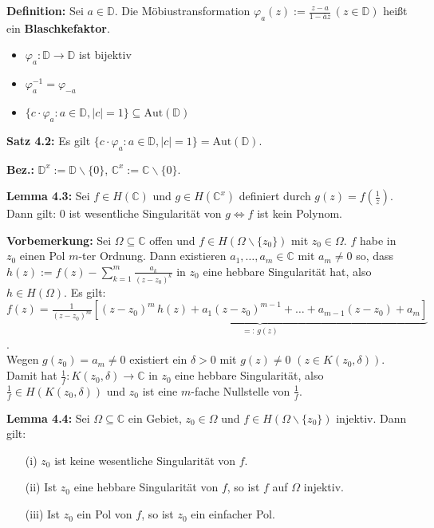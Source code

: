 \documentclass[11pt]{article}
\newcommand{\C}{\mathbb{C}}
\newcommand{\D}{\mathbb{D}}
\begin{document}
\textbf{Definition:} Sei $a \in \D$. Die Möbiustransformation $\varphi_a(z) := \frac{z-a}{1-\overline{a}z} \, (z \in \D)$ heißt ein \textbf{Blaschkefaktor}.
\vspace{-0.6cm}
\begin{itemize}
\item $\varphi_a \colon \D \to \D$ ist bijektiv \vspace{-0.2cm}
\item $\varphi_a^{-1} = \varphi_{-a}$ \vspace{-0.2cm}
\item $\{ c \cdot \varphi_a \colon a \in \D, |c| =1 \} \subseteq \text{Aut}(\D)$
\end{itemize}
\vspace{-0.3cm}

\textbf{Satz 4.2:} Es gilt $\{ c \cdot \varphi_a \colon a \in \D, |c| =1 \} = \text{Aut}(\D)$.

\textbf{Bez.:} $\D^x := \D \backslash \{0\}$, $\C^x := \C \backslash \{0\}$.

\textbf{Lemma 4.3:} Sei $f \in H(\C)$ und $g \in H(\C^x)$ definiert durch $g(z) = f(\frac{1}{z})$. Dann gilt: $0$ ist wesentliche Singularität von $g \Leftrightarrow f$ ist kein Polynom.

\textbf{Vorbemerkung:} Sei $\Omega \subseteq \C$ offen und $f \in H(\Omega \backslash \{ z_0 \})$ mit $z_0 \in \Omega$. $f$ habe in $z_0$ einen Pol $m$-ter Ordnung. Dann existieren $a_1, \dots , a_m \in \C$ mit $a_m \neq 0$ so, dass $h(z) := f(z) - \sum_{k=1}^m \frac{a_k}{(z - z_0)^k}$ in $z_0$ eine hebbare Singularität hat, also $h \in H(\Omega)$. Es gilt: \\
$f(z) = \frac{1}{(z - z_0)^m} \underbrace{[(z-z_0)^m \, h(z) + a_1 (z-z_0)^{m-1} + \dots + a_{m-1} (z - z_0) + a_m]}_{=: \, g(z)}$. \\
Wegen $g(z_0) = a_m \neq 0$ existiert ein $\delta > 0$ mit $g(z) \neq 0$ $(z \in K(z_0, \delta))$. Damit hat $\frac{1}{f} \colon K(z_0, \delta) \to \C$ in $z_0$ eine hebbare Singularität, also $\frac{1}{f} \in H(K(z_0, \delta))$ und $z_0$ ist eine $m$-fache Nullstelle von $\frac{1}{f}$.

\textbf{Lemma 4.4:} Sei $\Omega \subseteq \C$ ein Gebiet, $z_0 \in \Omega$ und $f\in H(\Omega \backslash \{z_0\})$ injektiv. Dann gilt:
\vspace{-0.6cm}
\begin{itemize}
\item[(i)] $z_0$ ist keine wesentliche Singularität von $f$. \vspace{-0.2cm}
\item[(ii)] Ist $z_0$ eine hebbare Singularität von $f$, so ist $f$ auf $\Omega$ injektiv. \vspace{-0.2cm}
\item[(iii)] Ist $z_0$ ein Pol von $f$, so ist $z_0$ ein einfacher Pol.
\end{itemize}
\vspace{-0.3cm}
\end{document}
